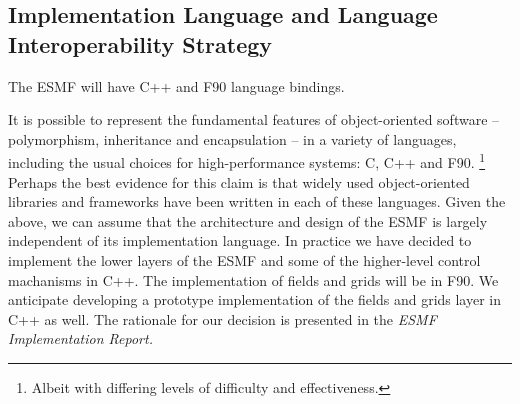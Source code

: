 \subsection{Implementation Language and Language Interoperability Strategy}

The ESMF will have C++ and F90 language bindings.

It is possible to represent the fundamental features of object-oriented 
software -- polymorphism, inheritance and encapsulation -- in a variety of languages, 
including the usual choices for high-performance systems: C, C++ and F90. \footnote{Albeit 
with differing levels of difficulty and effectiveness.}  Perhaps the best evidence for 
this claim is that widely used object-oriented libraries and frameworks have been 
written in each of these languages.  Given the above, we can assume that the architecture 
and design of the ESMF is largely independent of its implementation language.  
In practice we have decided to implement the lower layers 
of the ESMF and some of the higher-level control machanisms in C++.  The
implementation of fields and grids will be in F90.  We anticipate developing a 
prototype implementation of the fields and grids layer in C++ as well.
The rationale for our decision is presented in the {\it ESMF Implementation Report.}





